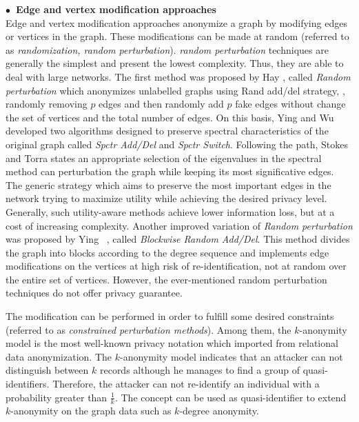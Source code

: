 \hspace{-2em}\textbf{$\bullet$~Edge and vertex modification approaches}\\
Edge and vertex modification approaches anonymize a graph by modifying edges or vertices in the graph. These modifications can be made at random (referred to as {\em randomization, random perturbation}). {\em random perturbation} techniques are generally the simplest and present the lowest complexity. Thus, they are able to deal with large networks. The first method was proposed by Hay {\etal}, called {\em Random perturbation} which anonymizes unlabelled graphs using Rand add/del strategy, {\ie}, randomly removing $p$ edges and then randomly add $p$ fake edges without change the set of vertices and the total number of edges. On this basis, Ying and Wu~\cite{Ying2009,Ying_Randomizing_2008} developed two algorithms designed to preserve spectral characteristics of the original graph called {\em Spctr Add/Del} and {\em Spctr Switch}. Following the path, Stokes and Torra states an appropriate selection of the eigenvalues in the spectral method  can perturbation the graph while keeping its most significative edges. The generic strategy which aims to preserve the most important edges in the network trying to maximize utility while achieving the desired privacy level. Generally, such utility-aware methods achieve lower information loss, but at a cost of increasing complexity. Another improved variation of {\em Random perturbation} was proposed by Ying {\etal}~\cite{Ying2009}, called {\em Blockwise Random Add/Del}. This method divides the graph into blocks according to the degree sequence and implements edge modifications on the vertices at high risk of re-identification, not at random over the entire set of vertices. However, the ever-mentioned random perturbation techniques do not offer privacy guarantee.

The modification can be performed in order to fulfill some desired constraints (referred to as {\em constrained perturbation methods}). Among them, the $k$-anonymity model is the most well-known privacy notation which imported from relational data anonymization. The $k$-anonymity model indicates that an attacker can not distinguish between $k$ records although he manages to find a group of quasi-identifiers. Therefore, the attacker can not re-identify an individual with a probability greater than $\frac{1}{k}$. The concept can be used as quasi-identifier to extend $k$-anonymity on the graph data such as $k$-degree anonymity. 

